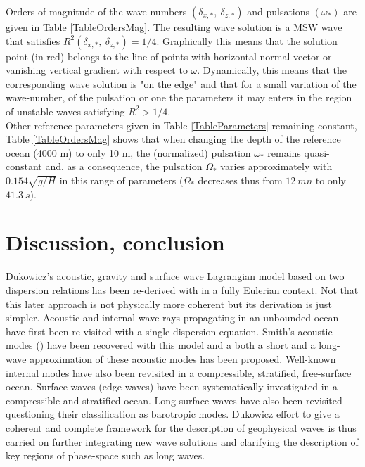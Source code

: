 \documentclass[a4paper,11pt]{article}
\begin{document}
Orders of magnitude of the wave-numbers $(\delta_{x,*},\ \delta_{z,*})$ and pulsations $(\omega_*)$ are given in Table \ref{TableOrdersMag}. The resulting wave solution is a MSW wave that satisfies $R^2(\delta_{x,*},\ \delta_{z,*})=1/4$. Graphically this means that the solution point (in red) belongs to the line of points with horizontal normal vector or vanishing vertical gradient with respect to $\omega$. Dynamically, this means that the corresponding wave solution is "on the edge" and that for a small variation of the wave-number, of the pulsation or one the parameters it may enters in the region of unstable waves satisfying $R^2>1/4$. \\
Other reference parameters given in Table \ref{TableParameters} remaining constant, Table \ref{TableOrdersMag} shows that when changing the depth of the reference ocean (4000 m) to only 10 m, the (normalized) pulsation $\omega_*$ remains quasi-constant and, as a consequence, the pulsation $\Omega_*$ varies approximately with $0.154 \sqrt{g/H}$ in this range of parameters ($\Omega_*$ decreases thus from $12\ mn$ to only $41.3\ s$).

\newpage
\section{Discussion, conclusion}
\label{SectionDiscussion}
Dukowicz's acoustic, gravity and surface wave Lagrangian model based on two dispersion relations \cite{dukowicz_2013} has been re-derived with in a fully Eulerian context. Not that this later approach is not physically more coherent but its derivation is just simpler. Acoustic and internal wave rays propagating in an unbounded ocean have first been re-visited with a single dispersion equation. Smith's acoustic modes (\cite{smith_2015}) have been recovered with this model and a both a short and a long-wave approximation of these acoustic modes has been proposed. Well-known internal modes have also been revisited in a compressible, stratified, free-surface ocean. Surface waves (edge waves) have been systematically investigated in a compressible and stratified ocean. Long surface waves have also been revisited questioning their classification as barotropic modes. Dukowicz effort to give a coherent and complete framework for the description of geophysical waves is thus carried on further integrating new wave solutions and clarifying the description of key regions of phase-space such as long waves.\\ 
\end{document}
